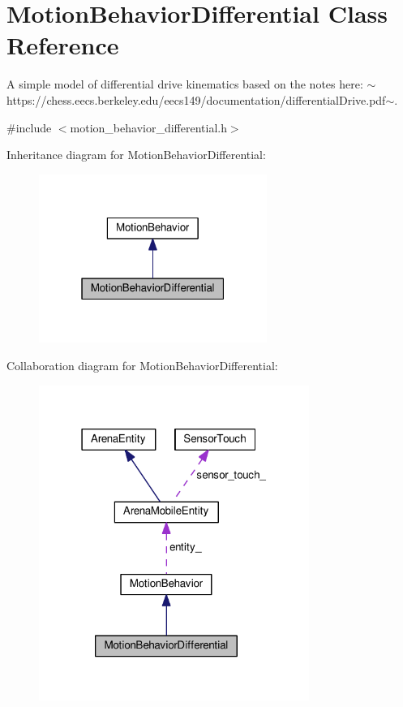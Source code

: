 \hypertarget{classMotionBehaviorDifferential}{}\section{Motion\+Behavior\+Differential Class Reference}
\label{classMotionBehaviorDifferential}


A simple model of differential drive kinematics based on the notes here\+: $\sim$https\+://chess.eecs.\+berkeley.\+edu/eecs149/documentation/differential\+Drive.pdf$\sim$.  




{\ttfamily \#include $<$motion\+\_\+behavior\+\_\+differential.\+h$>$}



Inheritance diagram for Motion\+Behavior\+Differential\+:
\nopagebreak
\begin{figure}[H]
\begin{center}
\leavevmode
\includegraphics[width=211pt]{classMotionBehaviorDifferential__inherit__graph}
\end{center}
\end{figure}


Collaboration diagram for Motion\+Behavior\+Differential\+:
\nopagebreak
\begin{figure}[H]
\begin{center}
\leavevmode
\includegraphics[width=250pt]{classMotionBehaviorDifferential__coll__graph}
\end{center}
\end{figure}
